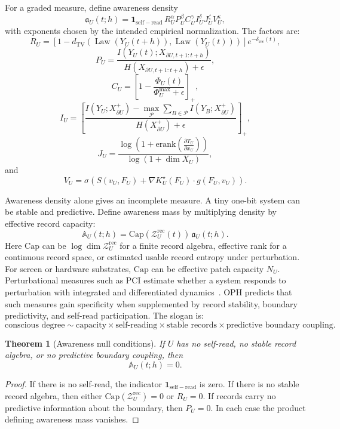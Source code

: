 \documentclass[11pt]{article}
\newtheorem{theorem}{Theorem}[section]
\theoremstyle{remark}
\theoremstyle{plain}
\newcommand{\TV}{\mathrm{TV}}
\newcommand{\rec}{\mathrm{rec}}
\newcommand{\bd}{\partial}
\newcommand{\erank}{\mathrm{erank}}
\begin{document}
For a graded measure, define awareness density
\[
\mathfrak a_U(t;h)
=
\mathbf 1_{\mathrm{self-read}}\,
R_U^\alpha
P_U^\beta
C_U^\gamma
I_U^\delta
J_U^\zeta
V_U^\kappa,
\]
with exponents chosen by the intended empirical normalization. The factors are:
\[
R_U
=
\left[
1-
d_{\TV}\!\left(
\operatorname{Law}(Y_U(t+h)),
\operatorname{Law}(Y_U(t))
\right)
\right]
e^{-\delta_{\rec}(t)},
\]
\[
P_U
=
\frac{
I\!\left(Y_U(t);X_{\bd U,t+1:t+h}\right)
}{
H\!\left(X_{\bd U,t+1:t+h}\right)+\epsilon
},
\]
\[
C_U
=
\left[
1-\frac{\Phi_U(t)}{\Phi_U^{\max}+\epsilon}
\right]_+,
\]
\[
I_U
=
\left[
\frac{
I(Y_U;X_{\bd U}^{+})
-
\max_{\mathcal P}
\sum_{B\in\mathcal P}I(Y_B;X_{\bd U}^{+})
}{
H(X_{\bd U}^{+})+\epsilon
}
\right]_+,
\]
\[
J_U
=
\frac{
\log\!\left(1+\erank\!\left(\frac{\partial T_U}{\partial x_U}\right)\right)
}{
\log(1+\dim X_U)
},
\]
and
\[
V_U
=
\sigma\!\left(
S(v_U,F_U)+\nabla K_U^\star(F_U)\cdot g(F_U,v_U)
\right).
\]

Awareness density alone gives an incomplete measure. A tiny one-bit system can be stable and predictive. Define awareness mass by multiplying density by effective record capacity:
\[
\boxed{
\mathbb A_U(t;h)
=
\mathrm{Cap}\!\left(\mathcal Z_U^{\rec}(t)\right)\,
\mathfrak a_U(t;h).
}
\]
Here \(\mathrm{Cap}\) can be \(\log\dim \mathcal Z_U^{\rec}\) for a finite record algebra, effective rank for a continuous record space, or estimated usable record entropy under perturbation. For screen or hardware substrates, \(\mathrm{Cap}\) can be effective patch capacity \(N_U\). Perturbational measures such as PCI estimate whether a system responds to perturbation with integrated and differentiated dynamics~\cite{Casali2013PCI}. OPH predicts that such measures gain specificity when supplemented by record stability, boundary predictivity, and self-read participation. The slogan is:
\[
\boxed{
\text{conscious degree}
\sim
\text{capacity}
\times
\text{self-reading}
\times
\text{stable records}
\times
\text{predictive boundary coupling}.
}
\]

\begin{theorem}[Awareness null conditions]
If \(U\) has no self-read, no stable record algebra, or no predictive boundary coupling, then
\[
\mathbb A_U(t;h)=0.
\]
\end{theorem}

\begin{proof}
If there is no self-read, the indicator \(\mathbf 1_{\mathrm{self-read}}\) is zero. If there is no stable record algebra, then either \(\mathrm{Cap}(\mathcal Z_U^{\rec})=0\) or \(R_U=0\). If records carry no predictive information about the boundary, then \(P_U=0\). In each case the product defining awareness mass vanishes.
\end{proof}
\end{document}
